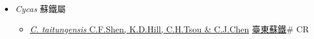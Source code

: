 
  \begin{itemize}
 \item[] \textit{Cycas} 蘇鐵屬
                    
  \begin{itemize}
        \item[] \href{http://www.theplantlist.org/tpl1.1/search?q=Cycas+taitungensis}{\textit{C. taitungensis} C.F.Shen, K.D.Hill, C.H.Tsou \& C.J.Chen}   \href{\detokenize{http://taibnet.sinica.edu.tw/chi/taibnet_species_list.php?T2=臺東蘇鐵&T2_new_value=true&fr=y}}{臺東蘇鐵}\# CR
  \end{itemize}
  \end{itemize}
